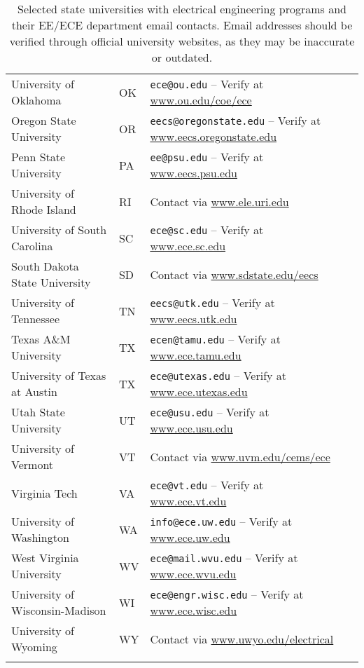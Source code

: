 \documentclass[12pt]{article}
\begin{document}
\begin{longtable}{p{} p{1cm} p{} p{0mm}}
University of Oklahoma & OK & \texttt{ece@ou.edu} – Verify at \url{www.ou.edu/coe/ece} \\
Oregon State University & OR & \texttt{eecs@oregonstate.edu} – Verify at \url{www.eecs.oregonstate.edu} \\
Penn State University & PA & \texttt{ee@psu.edu} – Verify at \url{www.eecs.psu.edu} \\
University of Rhode Island & RI & Contact via \url{www.ele.uri.edu} \\
University of South Carolina & SC & \texttt{ece@sc.edu} – Verify at \url{www.ece.sc.edu} \\
South Dakota State University & SD & Contact via \url{www.sdstate.edu/eecs} \\
University of Tennessee & TN & \texttt{eecs@utk.edu} – Verify at \url{www.eecs.utk.edu} \\
Texas A\&M University & TX & \texttt{ecen@tamu.edu} – Verify at \url{www.ece.tamu.edu} \\
University of Texas at Austin & TX & \texttt{ece@utexas.edu} – Verify at \url{www.ece.utexas.edu} \\
Utah State University & UT & \texttt{ece@usu.edu} – Verify at \url{www.ece.usu.edu} \\
University of Vermont & VT & Contact via \url{www.uvm.edu/cems/ece} \\
Virginia Tech & VA & \texttt{ece@vt.edu} – Verify at \url{www.ece.vt.edu} \\
University of Washington & WA & \texttt{info@ece.uw.edu} – Verify at \url{www.ece.uw.edu} \\
West Virginia University & WV & \texttt{ece@mail.wvu.edu} – Verify at \url{www.ece.wvu.edu} \\
University of Wisconsin-Madison & WI & \texttt{ece@engr.wisc.edu} – Verify at \url{www.ece.wisc.edu} \\
University of Wyoming & WY & Contact via \url{www.uwyo.edu/electrical} \\
\bottomrule
\caption{Selected state universities with electrical engineering programs and their EE/ECE department email contacts. Email addresses should be verified through official university websites, as they may be inaccurate or outdated.}
\label{tab:ee_contacts}
\end{longtable}
\end{document}
